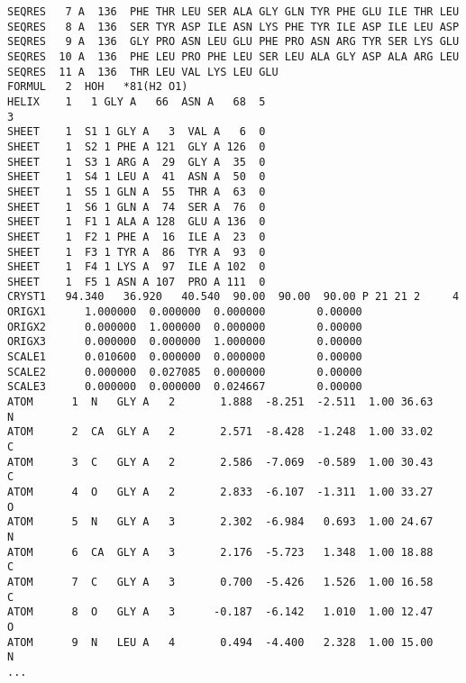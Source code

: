 \begin{lstlisting}
SEQRES   7 A  136  PHE THR LEU SER ALA GLY GLN TYR PHE GLU ILE THR LEU          
SEQRES   8 A  136  SER TYR ASP ILE ASN LYS PHE TYR ILE ASP ILE LEU ASP          
SEQRES   9 A  136  GLY PRO ASN LEU GLU PHE PRO ASN ARG TYR SER LYS GLU          
SEQRES  10 A  136  PHE LEU PRO PHE LEU SER LEU ALA GLY ASP ALA ARG LEU          
SEQRES  11 A  136  THR LEU VAL LYS LEU GLU                                      
FORMUL   2  HOH   *81(H2 O1)                                                    
HELIX    1   1 GLY A   66  ASN A   68  5                                   3    
SHEET    1  S1 1 GLY A   3  VAL A   6  0                                        
SHEET    1  S2 1 PHE A 121  GLY A 126  0                                        
SHEET    1  S3 1 ARG A  29  GLY A  35  0                                        
SHEET    1  S4 1 LEU A  41  ASN A  50  0                                        
SHEET    1  S5 1 GLN A  55  THR A  63  0                                        
SHEET    1  S6 1 GLN A  74  SER A  76  0                                        
SHEET    1  F1 1 ALA A 128  GLU A 136  0                                        
SHEET    1  F2 1 PHE A  16  ILE A  23  0                                        
SHEET    1  F3 1 TYR A  86  TYR A  93  0                                        
SHEET    1  F4 1 LYS A  97  ILE A 102  0                                        
SHEET    1  F5 1 ASN A 107  PRO A 111  0                                        
CRYST1   94.340   36.920   40.540  90.00  90.00  90.00 P 21 21 2     4          
ORIGX1      1.000000  0.000000  0.000000        0.00000                         
ORIGX2      0.000000  1.000000  0.000000        0.00000                         
ORIGX3      0.000000  0.000000  1.000000        0.00000                         
SCALE1      0.010600  0.000000  0.000000        0.00000                         
SCALE2      0.000000  0.027085  0.000000        0.00000                         
SCALE3      0.000000  0.000000  0.024667        0.00000                         
ATOM      1  N   GLY A   2       1.888  -8.251  -2.511  1.00 36.63           N  
ATOM      2  CA  GLY A   2       2.571  -8.428  -1.248  1.00 33.02           C  
ATOM      3  C   GLY A   2       2.586  -7.069  -0.589  1.00 30.43           C  
ATOM      4  O   GLY A   2       2.833  -6.107  -1.311  1.00 33.27           O  
ATOM      5  N   GLY A   3       2.302  -6.984   0.693  1.00 24.67           N  
ATOM      6  CA  GLY A   3       2.176  -5.723   1.348  1.00 18.88           C  
ATOM      7  C   GLY A   3       0.700  -5.426   1.526  1.00 16.58           C  
ATOM      8  O   GLY A   3      -0.187  -6.142   1.010  1.00 12.47           O  
ATOM      9  N   LEU A   4       0.494  -4.400   2.328  1.00 15.00           N  
... 


\end{lstlisting}
